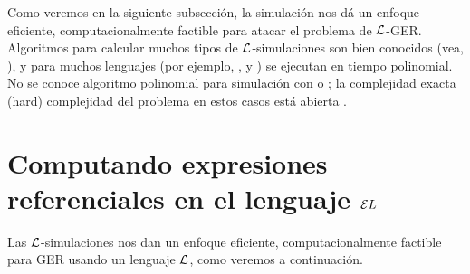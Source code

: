 

Como veremos en la siguiente subsecci\'on, la simulaci\'on nos d\'a un
enfoque eficiente, computacionalmente factible para atacar el problema de $\mathcal{L}$-GER. Algoritmos para calcular muchos tipos de $\mathcal{L}$-simulaciones son
bien conocidos (vea, \cite{H71,areces08,HHK95,DPP03}), y para muchos
lenguajes (por ejemplo, \ALC, \ELAN y \EL) se ejecutan en tiempo polinomial. No se conoce algoritmo polinomial 
 para simulaci\'on con \FOL o \EPFOL; la complejidad exacta (hard)
complejidad del problema en estos casos est\'a abierta \cite{gare:comp79}.

\section{Computando expresiones referenciales en el lenguaje $\mathcal{E}L$}\label{sec:simulation}
\label{sec:greViaSimulacion}

Las $\mathcal{L}$-simulaciones nos dan un enfoque eficiente, computacionalmente factible para GER usando un lenguaje $\mathcal{L}$, como veremos a continuaci\'on.

